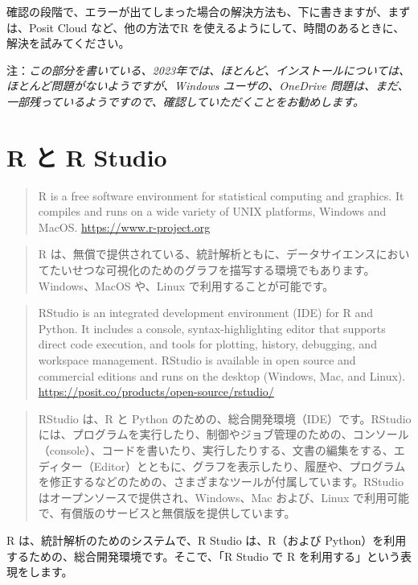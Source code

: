 \documentclass[
  xelatex, ja=standard]{bxjsbook}
\theoremstyle{definition}
\theoremstyle{definition}
\theoremstyle{definition}
\theoremstyle{definition}
\theoremstyle{remark}
\begin{document}
確認の段階で、エラーが出てしまった場合の解決方法も、下に書きますが、まずは、Posit Cloud など、他の方法でR を使えるようにして、時間のあるときに、解決を試みてください。

注：\emph{この部分を書いている、2023年では、ほとんど、インストールについては、ほとんど問題がないようですが、Windows ユーザの、OneDrive 問題は、まだ、一部残っているようですので、確認していただくことをお勧めします。}

\hypertarget{r-ux3068-r-studio}{%
\section{R と R Studio}\label{r-ux3068-r-studio}}

\begin{quote}
R is a free software environment for statistical computing and graphics. It compiles and runs on a wide variety of UNIX platforms, Windows and MacOS. \url{https://www.r-project.org}
\end{quote}

\begin{quote}
R は、無償で提供されている、統計解析ともに、データサイエンスにおいてたいせつな可視化のためのグラフを描写する環境でもあります。Windows、MacOS や、Linux で利用することが可能です。
\end{quote}

\begin{quote}
RStudio is an integrated development environment (IDE) for R and Python. It includes a console, syntax-highlighting editor that supports direct code execution, and tools for plotting, history, debugging, and workspace management. RStudio is available in open source and commercial editions and runs on the desktop (Windows, Mac, and Linux).　\url{https://posit.co/products/open-source/rstudio/}
\end{quote}

\begin{quote}
RStudio は、R と Python のための、総合開発環境（IDE）です。RStudio には、プログラムを実行したり、制御やジョブ管理のための、コンソール（console）、コードを書いたり、実行したりする、文書の編集をする、エディター（Editor）とともに、グラフを表示したり、履歴や、プログラムを修正するなどのための、さまざまなツールが付属しています。RStudio はオープンソースで提供され、Windows、Mac および、Linux で利用可能で、有償版のサービスと無償版を提供しています。
\end{quote}

R は、統計解析のためのシステムで、R Studio は、R（および Python）を利用するための、総合開発環境です。そこで、「R Studio で R を利用する」という表現をします。
\end{document}
